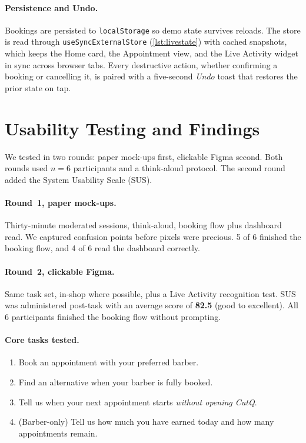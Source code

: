 \documentclass[12pt,a4paper]{article}
\begin{document}
\paragraph{Persistence and Undo.}
Bookings are persisted to \texttt{localStorage} so demo state survives
reloads. The store is read through \texttt{useSyncExternalStore}
(\cref{lst:livestate}) with cached snapshots, which keeps the Home
card, the Appointment view, and the Live Activity widget in sync
across browser tabs. Every destructive action, whether confirming a
booking or cancelling it, is paired with a five-second \emph{Undo}
toast that restores the prior state on tap.

\section{Usability Testing and Findings}
\label{sec:testing}

We tested in two rounds: paper mock-ups first, clickable Figma
second. Both rounds used $n=6$ participants and a think-aloud
protocol. The second round added the System Usability Scale (SUS).

\paragraph{Round~1, paper mock-ups.}
Thirty-minute moderated sessions, think-aloud, booking flow plus
dashboard read. We captured confusion points before pixels were
precious. 5 of 6 finished the booking flow, and 4 of 6 read the
dashboard correctly.

\paragraph{Round~2, clickable Figma.}
Same task set, in-shop where possible, plus a Live Activity
recognition test. SUS was administered post-task with an average
score of \textbf{82.5} (good to excellent). All 6 participants
finished the booking flow without prompting.

\paragraph{Core tasks tested.}
\begin{enumerate}[noitemsep]
  \item Book an appointment with your preferred barber.
  \item Find an alternative when your barber is fully booked.
  \item Tell us when your next appointment starts \emph{without
        opening CutQ}.
  \item (Barber-only) Tell us how much you have earned today and
        how many appointments remain.
\end{enumerate}
\end{document}
